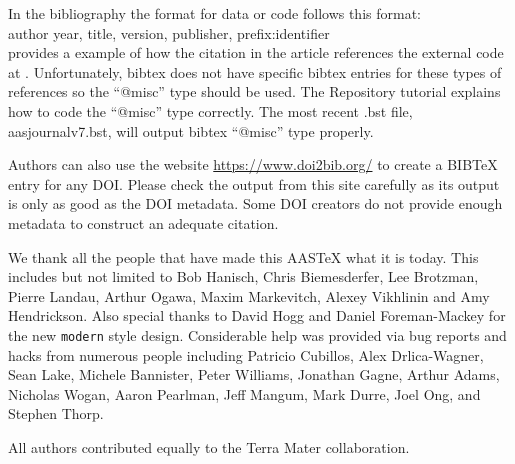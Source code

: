 \documentclass[linenumbers,amsmath,trackchanges]{aastex702}
\begin{document}
In the bibliography the format for data or code follows this format: \\

\noindent author year, title, version, publisher, prefix:identifier\\

\citet{2015ApJ...805...23C} provides a example of how the citation in the
article references the external code at
.  Unfortunately, bibtex does
not have specific bibtex entries for these types of references so the
``@misc'' type should be used.  The Repository tutorial explains how to
code the ``@misc'' type correctly.  The most recent .bst file, aasjournalv7.bst, will output bibtex ``@misc'' type properly.

Authors can also use the website \url{https://www.doi2bib.org/} to create a BIBTeX entry for any DOI. Please check the output from this site carefully as its output is only as good as the DOI metadata. Some DOI creators do not provide enough metadata to construct an adequate citation.

\begin{acknowledgments}
We thank all the people that have made this AASTeX what it is today.  This
includes but not limited to Bob Hanisch, Chris Biemesderfer, Lee Brotzman,
Pierre Landau, Arthur Ogawa, Maxim Markevitch, Alexey Vikhlinin and Amy
Hendrickson. Also special thanks to David Hogg and Daniel Foreman-Mackey
for the new {\tt\string modern} style design. Considerable help was provided via bug
reports and hacks from numerous people including Patricio Cubillos, Alex
Drlica-Wagner, Sean Lake, Michele Bannister, Peter Williams, Jonathan
Gagne, Arthur Adams, Nicholas Wogan, Aaron Pearlman, Jeff Mangum, Mark Durre, Joel Ong, and Stephen Thorp.
\end{acknowledgments}

\begin{contribution}

All authors contributed equally to the Terra Mater collaboration.


\end{contribution}
\end{document}
